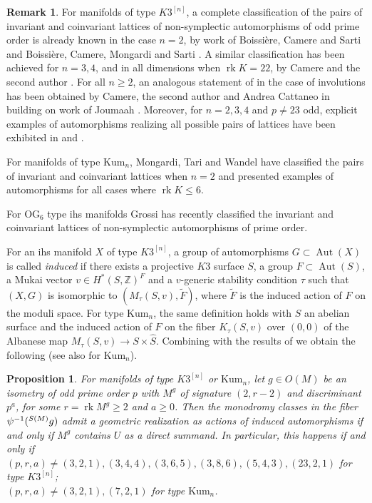 \documentclass{amsart}
\theoremstyle{definition}
\newtheorem{remark}[definition]{Remark}
\theoremstyle{plain}
\newtheorem{proposition}[definition]{Proposition}
\DeclareMathOperator{\rk}{rk}
\DeclareMathOperator{\aut}{Aut}
\newcommand{\IZ}{\mathbb{Z}}
\newcommand{\kumn}{\mathrm{Kum}_n}
\newcommand{\hskn}{K3^{\left[n\right]}}
\begin{document}
\begin{remark}
For manifolds of type $\hskn$, a complete classification of the pairs of invariant and coinvariant lattices of non-symplectic automorphisms of odd prime order is already known in the case $n=2$, by work of Boissi\`ere, Camere and Sarti \cite[Thm.\ 7.1]{bcs} and Boissi\`ere, Camere, Mongardi and Sarti \cite[Thm.\ 6.1]{bcms_p=23}. A similar classification has been achieved for $n=3,4$, and in all dimensions when $\rk K = 22$, by Camere and the second author \cite[Thms.\ 1.2, 4.4]{CC}. For all $n \geq 2$, an analogous statement of  in the case of involutions has been obtained by Camere, the second author and Andrea Cattaneo in \cite[Thm.\ 2.3]{CCC} building on work of Joumaah \cite{joumaa:order2}. Moreover, for $n = 2,3,4$ and $p \neq 23$ odd, explicit examples of automorphisms realizing all possible pairs of lattices have been exhibited in \cite{bcs} and \cite{CC}.

For manifolds of type $\kumn$, Mongardi, Tari and Wandel \cite{mongardi_tari_wandel:kummer} have classified the pairs of invariant and coinvariant lattices when $n=2$ and presented examples of automorphisms for all cases where $\rk K \leq 6$.

For OG$_6$ type ihs manifolds Grossi has recently classified the invariant and coinvariant lattices \cite{grossi:nonsymplectic} of non-symplectic automorphisms of prime order.
\end{remark}

For an ihs manifold $X$ of type $\hskn$, a group of automorphisms $G \subset \aut(X)$ is called \emph{induced} if there exists a projective $K3$ surface $S$, a group $F \subset \aut(S)$, a Mukai vector $v \in H^*(S, \IZ)^F$ and a $v$-generic stability condition $\tau$ such that $(X, G)$ is isomorphic to $(M_\tau(S,v), \tilde{F})$, where $\tilde{F}$ is the induced action of $F$ on the moduli space. For type $\kumn$, the same definition holds with $S$ an abelian surface and the induced action of $F$ on the fiber $K_\tau(S,v)$ over $(0,0)$ of the Albanese map $M_\tau(S,v) \rightarrow S \times \hat{S}$. Combining  with the results of \cite[\S 3]{mongardi_wandel:induced} we obtain the following (see also \cite[\S 2]{mongardi_tari_wandel:kummer} for $\kumn$).


\begin{proposition}
For manifolds of type $\hskn$ or $\kumn$, let $g \in O(M)$ be an isometry of odd prime order $p$ with $M^g$ of signature $(2, r-2)$ and discriminant $p^a$, for some $r = \rk M^g \geq 2$ and $a \geq 0$. Then the monodromy classes in the fiber $\psi^{-1}(\prescript{S(M)}{}g)$ admit a geometric realization as actions of induced automorphisms if and only if $M^g$ contains $U$ as a direct summand. In particular, this happens if and only if\\
$(p,r,a) \neq (3,2,1), (3,4,4), (3,6,5), (3,8,6), (5,4,3), (23,2,1)$ for type $\hskn$;\\
$(p,r,a) \neq (3,2,1), (7,2,1)$ for type $\kumn$.
\end{proposition}
\end{document}
